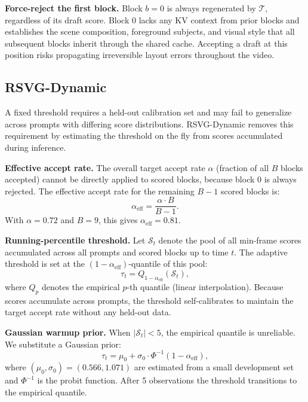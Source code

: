 \documentclass{article}
\newcommand{\Target}{\mathcal{T}}
\newcommand{\threshold}{\tau}
\newcommand{\alphaeff}{\alpha_{\mathrm{eff}}}
\begin{document}
\textbf{Force-reject the first block.}
Block $b=0$ is always regenerated by $\Target$, regardless of its draft
score.
Block 0 lacks any KV context from prior blocks and establishes the scene
composition, foreground subjects, and visual style that all subsequent
blocks inherit through the shared cache.
Accepting a draft at this position risks propagating irreversible layout
errors throughout the video.

\subsection{RSVG-Dynamic}

A fixed threshold requires a held-out calibration set and may fail to
generalize across prompts with differing score distributions.
RSVG-Dynamic removes this requirement by estimating the threshold on the
fly from scores accumulated during inference.

\textbf{Effective accept rate.}
The overall target accept rate $\alpha$ (fraction of all $B$ blocks
accepted) cannot be directly applied to scored blocks, because block 0 is
always rejected.
The effective accept rate for the remaining $B-1$ scored blocks is:
\begin{equation}
  \alphaeff = \frac{\alpha \cdot B}{B - 1}.
  \label{eq:effective-rate}
\end{equation}
With $\alpha{=}0.72$ and $B{=}9$, this gives $\alphaeff = 0.81$.

\textbf{Running-percentile threshold.}
Let $\mathcal{S}_t$ denote the pool of all min-frame scores accumulated
across all prompts and scored blocks up to time $t$.
The adaptive threshold is set at the $(1-\alphaeff)$-quantile of this
pool:
\begin{equation}
  \threshold_t = Q_{1 - \alphaeff}(\mathcal{S}_t),
  \label{eq:threshold}
\end{equation}
where $Q_p$ denotes the empirical $p$-th quantile (linear interpolation).
Because scores accumulate across prompts, the threshold self-calibrates
to maintain the target accept rate without any held-out data.

\textbf{Gaussian warmup prior.}
When $|\mathcal{S}_t| < 5$, the empirical quantile is unreliable.
We substitute a Gaussian prior:
\begin{equation}
  \threshold_t = \mu_0 + \sigma_0 \cdot \Phi^{-1}(1 - \alphaeff),
  \label{eq:warmup}
\end{equation}
where $(\mu_0, \sigma_0) = (0.566, 1.071)$ are estimated from a small
development set and $\Phi^{-1}$ is the probit function.
After 5 observations the threshold transitions to the empirical quantile.
\end{document}
